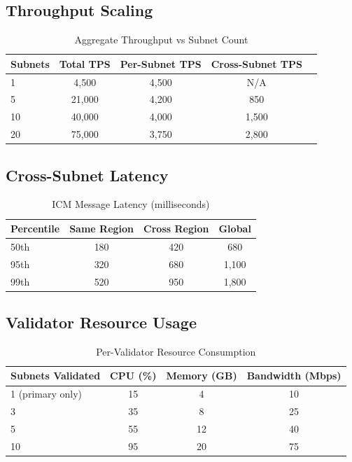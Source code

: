 \documentclass[11pt,a4paper]{article}
\begin{document}
\subsection{Throughput Scaling}

\begin{table}[h]
\centering
\caption{Aggregate Throughput vs Subnet Count}
\begin{tabular}{@{}lcccc@{}}
\toprule
Subnets & Total TPS & Per-Subnet TPS & Cross-Subnet TPS \\
\midrule
1 & 4,500 & 4,500 & N/A \\
5 & 21,000 & 4,200 & 850 \\
10 & 40,000 & 4,000 & 1,500 \\
20 & 75,000 & 3,750 & 2,800 \\
\bottomrule
\end{tabular}
\end{table}

\subsection{Cross-Subnet Latency}

\begin{table}[h]
\centering
\caption{ICM Message Latency (milliseconds)}
\begin{tabular}{@{}lccc@{}}
\toprule
Percentile & Same Region & Cross Region & Global \\
\midrule
50th & 180 & 420 & 680 \\
95th & 320 & 680 & 1,100 \\
99th & 520 & 950 & 1,800 \\
\bottomrule
\end{tabular}
\end{table}

\subsection{Validator Resource Usage}

\begin{table}[h]
\centering
\caption{Per-Validator Resource Consumption}
\begin{tabular}{@{}lccc@{}}
\toprule
Subnets Validated & CPU (\%) & Memory (GB) & Bandwidth (Mbps) \\
\midrule
1 (primary only) & 15 & 4 & 10 \\
3 & 35 & 8 & 25 \\
5 & 55 & 12 & 40 \\
10 & 95 & 20 & 75 \\
\bottomrule
\end{tabular}
\end{table}
\end{document}
